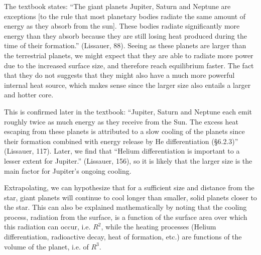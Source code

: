 \documentclass[11pt]{article}
\begin{document}
The textbook states: “The giant planets Jupiter, Saturn and Neptune are exceptions [to the rule that most planetary bodies radiate the same amount of energy as they absorb from the sun]. These bodies radiate significantly more energy than they absorb because they are still losing heat produced during the time of their formation.” (Lissauer, 88). Seeing as these planets are larger than the terrestrial planets, we might expect that they are able to radiate more power due to the increased surface size, and therefore reach equilibrium faster. The fact that they do not suggests that they might also have a much more powerful internal heat source, which makes sense since the larger size also entails a larger and hotter core.

This is confirmed later in the textbook: “Jupiter, Saturn and Neptune each emit roughly twice as much energy as they receive from the Sun. The excess heat escaping from these planets is attributed to a slow cooling of the planets since their formation combined with energy release by He differentiation (§6.2.3)” (Lissauer, 117). Later, we find that “Helium differentiation is important to a lesser extent for Jupiter.” (Lissauer, 156), so it is likely that the larger size is the main factor for Jupiter’s ongoing cooling.

Extrapolating, we can hypothesize that for a sufficient size and distance from the star, giant planets will continue to cool longer than smaller, solid planets closer to the star. This can also be explained mathematically by noting that the cooling process, radiation from the surface, is a function of the surface area over which this radiation can occur, i.e. $R^2$, while the heating processes (Helium differentiation, radioactive decay, heat of formation, etc.) are functions of the volume of the planet, i.e. of $R^3$.

	\newpage
\end{document}
